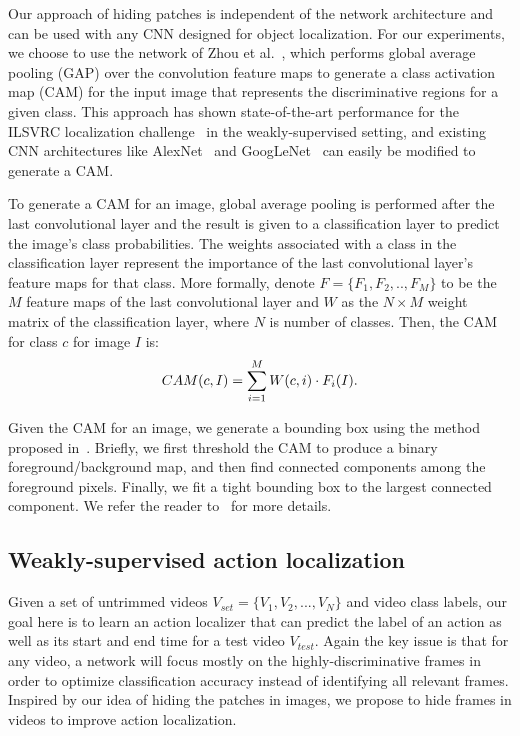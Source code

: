 \documentclass[10pt,twocolumn,letterpaper]{article}
\begin{document}
Our approach of hiding patches is independent of the network architecture and can be used with any CNN designed for object localization.  For our experiments, we choose to use the network of Zhou et al.~\cite{zhou-cvpr2016}, which performs global average pooling (GAP) over the convolution feature maps to generate a class activation map (CAM) for the input image that represents the discriminative regions for a given class.  This approach has shown state-of-the-art performance for the ILSVRC localization challenge~\cite{Russakovsky-IJCV2015} in the weakly-supervised setting, and existing CNN architectures like AlexNet~\cite{krizhevsky-nips2012} and GoogLeNet~\cite{Szegedy-CVPR2015} can easily be modified to generate a CAM.

To generate a CAM for an image, global average pooling is performed after the last convolutional layer and the result is given to a classification layer to predict the image's class probabilities.  The weights associated with a class in the classification layer represent the importance of the last convolutional layer's feature maps for that class.  More formally, denote $F=\{F_1,F_2,..,F_M\}$ to be the $M$ feature maps of the last convolutional layer and $W$ as the $N \times M$ weight matrix of the classification layer, where $N$ is number of classes.  Then, the CAM for class $c$ for image $I$ is:
\vspace{-2pt}\begin{equation}
CAM(c,I) = \sum_{i=1}^{M} W(c,i) \cdot F_i(I).
\vspace{-2pt}
\label{eq:cam}
\end{equation}

Given the CAM for an image, we generate a bounding box using the method proposed in~\cite{zhou-cvpr2016}. Briefly, we first threshold the CAM to produce a binary foreground/background map, and then find connected components among the foreground pixels. Finally, we fit a tight bounding box to the largest connected component.  We refer the reader to~\cite{zhou-cvpr2016} for more details.

\subsection{Weakly-supervised action localization}

Given a set of untrimmed videos $V_{set}=\{V_1,V_2,...,V_N\}$ and video class labels, our goal here is to learn an action localizer that can predict the label of an action as well as its start and end time for a test video $V_{test}$.  Again the key issue is that for any video, a network will focus mostly on the highly-discriminative frames in order to optimize classification accuracy instead of identifying all relevant frames.  Inspired by our idea of hiding the patches in images, we propose to hide frames in videos to improve action localization.
\end{document}
